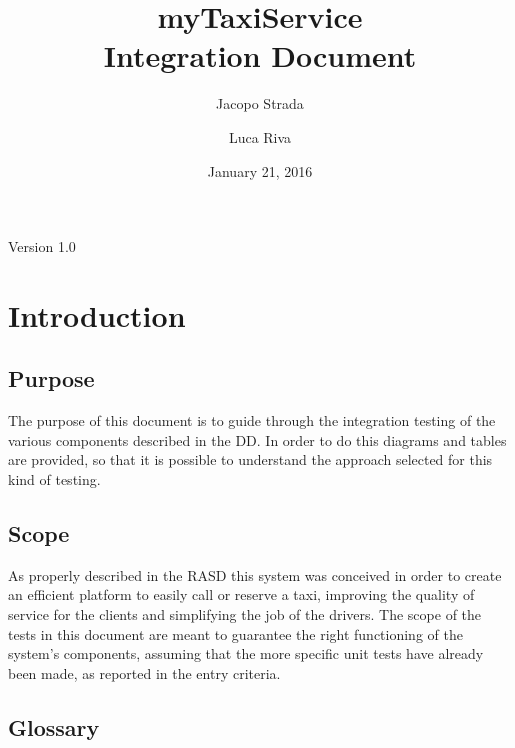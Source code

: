 \documentclass[a4paper]{article}
\title{{\Huge myTaxiService} \\ Integration Document}
\author{Jacopo Strada \and Luca Riva}
\date{January 21, 2016}
\begin{document}
\maketitle
\vfill
\begin{flushright}
Version 1.0
\end{flushright}

\newpage

\tableofcontents

\newpage

\listoffigures

\listoftables


\let\stdsection\section
\renewcommand\section{\newpage\stdsection}

\setlength{\parindent}{0em}
\setlength{\parskip}{1em}

\section{Introduction}

\subsection{Purpose}
The purpose of this document is to guide through the integration testing of the various components described in the DD. In order to do this diagrams and tables are provided, so that it is possible to understand the approach selected for this kind of testing.

\subsection{Scope} 
As properly described in the RASD this system was conceived in order to create an efficient platform to easily call or reserve a taxi, improving the quality of service for the clients and simplifying the job of the drivers. The scope of the tests in this document are meant to guarantee the right functioning of the system's components, assuming that the more specific unit tests have already been made, as reported in the entry criteria.

\subsection{Glossary}
\end{document}
